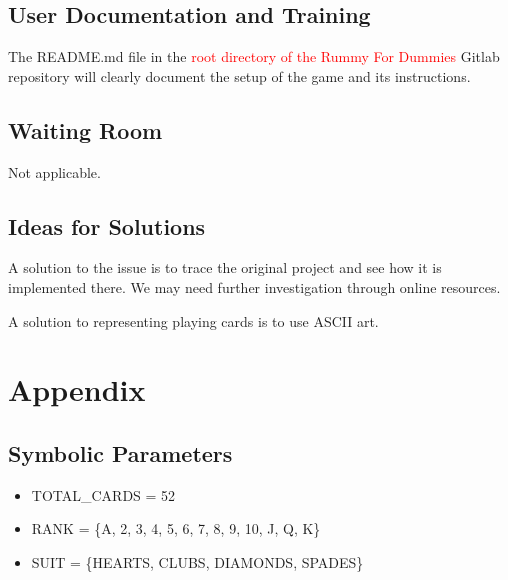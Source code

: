 \documentclass[12pt, titlepage]{article}
\begin{document}
\subsection{User Documentation and Training}
The README.md file in the \textcolor{red}{root directory of the Rummy For Dummies} Gitlab repository will clearly document the setup of the game and its instructions.

\subsection{Waiting Room}
Not applicable.

\subsection{Ideas for Solutions}
A solution to the issue is to trace the original project and see how it is implemented there. We may need further investigation through online resources. 

A solution to representing playing cards is to use ASCII art.




\newpage

\section{Appendix}
\subsection{Symbolic Parameters}
\begin{itemize}
    \item TOTAL\_CARDS = 52
    \item RANK = \{A, 2, 3, 4, 5, 6, 7, 8, 9, 10, J, Q, K\}
    \item SUIT = \{HEARTS, CLUBS, DIAMONDS, SPADES\}
\end{itemize}
\end{document}
